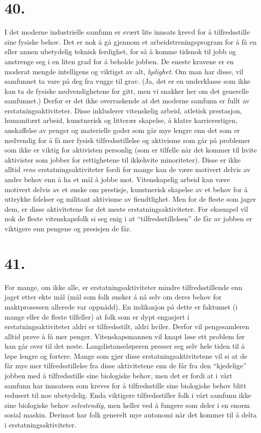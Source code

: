 \documentclass[oneside]{book}
\begin{document}
\section*{40.}
I det moderne industrielle samfunn er svært lite innsats krevd for å
tilfredsstille sine fysiske behov. Det er nok å gå gjennom et
arbeidstreningsprogram for å få en eller annen ubetydelig teknisk ferdighet,
for så å komme tidsnok til jobb og anstrenge seg i en liten grad for å beholde
jobben. De eneste kravene er en moderat mengde intelligens og viktigst av alt,
{\em lydighet}. Om man har disse, vil samfunnet ta vare på deg fra vugge til
grav. (Ja, det er en underklasse som ikke kan ta de fysiske nødvendighetene for
gitt, men vi snakker her om det generelle samfunnet.) Derfor er det ikke
overraskende at det moderne samfunn er fullt av erstatningsaktiviteter. Disse
inkluderer vitenskelig arbeid, atletisk prestasjon, humanitært arbeid,
kunstnerisk og litterær skapelse, å klatre karrierestigen, anskaffelse av
penger og materielle goder som går mye lengre enn det som er nødvendig for å få
mer fysisk tilfredsstillelse og aktivisme som går på problemer som ikke er
viktig for aktivisten personlig (som er tilfelle når det kommer til hvite
aktivister som jobber for rettighetene til ikkehvite minoriteter). Disse er
ikke alltid {\em rene} erstatningsaktiviteter fordi for mange kan de være
motivert delvis av andre behov enn å ha et mål å jobbe mot. Vitenskapelig
arbeid kan være motivert delvis av et ønske om prestisje, kunstnerisk skapelse
av et behov for å uttrykke følelser og militant aktivisme av fiendtlighet. Men
for de fleste som jager dem, er disse aktivitetene for det meste
erstatningsaktiviteter. For eksempel vil nok de fleste vitenskapsfolk si seg
enig i at ``tilfredsstillelsen'' de får av jobben er viktigere enn pengene og
presisjen de får.

\section*{41.}
For mange, om ikke alle, er erstatningsaktiviteter mindre tilfredsstillende enn
jaget etter ekte mål (mål som folk ønsker å nå selv om deres behov for
maktprosessen allerede var oppnådd). En indikasjon på dette er faktumet (i
mange eller de fleste tilfeller) at folk som er dypt engasjert i
erstatningsaktiviteter aldri er tilfredsstilt, aldri hviler. Derfor vil
pengesamleren alltid prøve å få mer penger. Vitenskapsmannen vil knapt løse ett
problem før han går over til det neste. Langdistanseløperen presser seg selv
hele tiden til å løpe lengre og fortere. Mange som gjør disse
erstatningsaktivitetene vil si at de får mye mer tilfredsstillelse fra disse
aktivitetene enn de får fra den ``kjedelige'' jobben med å tilfredsstille sine
biologiske behov, men det er fordi at i vårt samfunn har innsatsen som kreves
for å tilfredsstille sine biologiske behov blitt redusert til noe ubetydelig.
Enda viktigere tilfredsstiller folk i vårt samfunn ikke sine biologiske behov
{\em selvstendig}, men heller ved å fungere som deler i en enorm sosial maskin.
Derimot har folk generelt mye autonomi når det kommer til å delta i
erstatningsaktiviteter.
\end{document}
